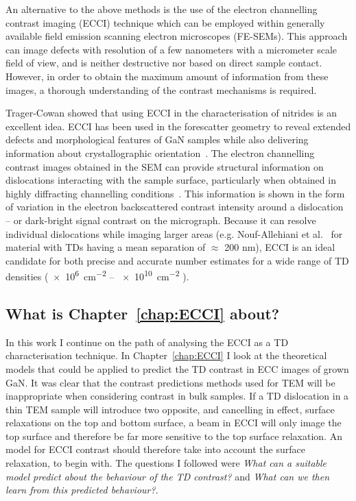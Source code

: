 An alternative to the above methods is the use of the electron  channelling contrast imaging (ECCI) technique which can be employed within generally available field emission scanning electron microscopes (FE-SEMs). This approach can image defects with resolution of a few nanometers with a micrometer scale field of view, and is neither destructive nor based on direct sample contact. However, in order to obtain the maximum amount of information from these images, a thorough understanding of the contrast mechanisms is required.

Trager-Cowan \etal\cite{Carol} showed that using ECCI in the characterisation of nitrides is an excellent idea. ECCI has been used in the forescatter geometry to reveal extended defects and
morphological features of GaN samples while also delivering information about crystallographic orientation~\cite{Picard}. The electron channelling contrast images obtained in the SEM can provide structural information on dislocations  interacting with the sample surface, particularly when obtained in highly diffracting channelling conditions~\cite{Naresh}. This information is shown in the form of variation in the electron backscattered contrast intensity around a dislocation -- or dark-bright signal contrast on the micrograph. Because it can resolve individual dislocations while imaging larger areas (e.g. Nouf-Allehiani et al.~\cite{Nouf} for material with TDs having a mean separation of $\approx$ 200 nm), ECCI is an ideal candidate for both precise and accurate number estimates for a wide range of TD densities (\SI{e6}{\centi \metre^{-2}} -- \SI{e10}{\centi \metre^{-2}} ).


\subsection{What is Chapter~\ref{chap:ECCI} about?}


In this work I continue on the path of analysing the ECCI as a TD characterisation technique. In Chapter~\ref{chap:ECCI} I look at the theoretical models that could be applied to predict the TD contrast in ECC images of \hkl[0001] grown GaN. It was clear that the contrast predictions methods used for TEM will be inappropriate when considering contrast in bulk samples. If a TD dislocation in a thin TEM sample will introduce two opposite, and cancelling in effect, surface relaxations on the top and bottom surface, a beam in ECCI will only image the top surface and therefore be far more sensitive to the top surface relaxation. An model for ECCI contrast should therefore take into account the surface relaxation, to begin with. The questions I followed were \textit{What can a suitable model predict about the behaviour of the TD contrast?} and \textit{What can we then learn from this predicted behaviour?}.

